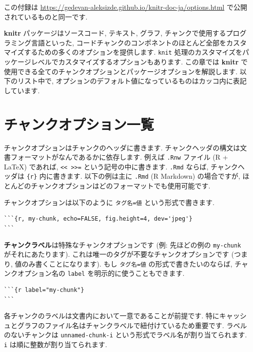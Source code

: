 \documentclass[
  11pt,
]{bxjsreport}
\makeatletter
\newenvironment{kframe}{%
\medskip{}
\setlength{\fboxsep}{.8em}
 \def\at@end@of@kframe{}%
 \ifinner\ifhmode%
  \def\at@end@of@kframe{\end{minipage}}%
  \begin{minipage}{\columnwidth}%
 \fi\fi%
 \def\FrameCommand##1{\hskip\@totalleftmargin \hskip-\fboxsep
 \colorbox{shadecolor}{##1}\hskip-\fboxsep
     \hskip-\linewidth \hskip-\@totalleftmargin \hskip\columnwidth}%
 \MakeFramed {\advance\hsize-\width
   \@totalleftmargin\z@ \linewidth\hsize
   \@setminipage}}%
 {\par\unskip\endMakeFramed%
 \at@end@of@kframe}
\newenvironment{rmdblock}[1]
  {
  \begin{itemize}
  \renewcommand{\labelitemi}{
    \raisebox{-.7\height}[0pt][0pt]{
      {\setkeys{Gin}{width=3em,keepaspectratio}\texttt{[image: \_latex/\_img/\#1]}}
    }
  }
  \setlength{\fboxsep}{1em}
  \begin{kframe}
  \item
  }
  {
  \end{kframe}
  \end{itemize}
  }
\newenvironment{rmdtip}
  {\begin{rmdblock}{tip}}
  {\end{rmdblock}}
\makeatother
\begin{document}
\begin{rmdtip}
この付録は \url{https://gedevan-aleksizde.github.io/knitr-doc-ja/options.html} で公開されているものと同一です. \end{rmdtip}

\textbf{knitr} パッケージはソースコード, テキスト, グラフ, チャンクで使用するプログラミング言語といった, コードチャンクのコンポネントのほとんど全部をカスタマイズするための多くのオプションを提供します. \texttt{knit} 処理のカスタマイズをパッケージレベルでカスタマイズするオプションもあります. この章では \textbf{knitr} で使用できる全てのチャンクオプションとパッケージオプションを解説します. 以下のリスト中で, オプションのデフォルト値になっているものはカッコ内に表記しています.

\hypertarget{chunk-options-full}{%
\section{チャンクオプション一覧}\label{chunk-options-full}}

チャンクオプションはチャンクのヘッダに書きます. チャンクヘッダの構文は文書フォーマットがなんであるかに依存します. 例えば \texttt{.Rnw} ファイル (R + LaTeX) であれば, \texttt{\textless{}\textless{}\ \textgreater{}\textgreater{}=} という記号の中に書きます. \texttt{.Rmd} ならば, チャンクヘッダは \texttt{\textasciigrave{}\textasciigrave{}\textasciigrave{}\{r\}} 内に書きます. 以下の例は主に \texttt{.Rmd} (R Markdown) の場合ですが, ほとんどのチャンクオプションはどのフォーマットでも使用可能です.

チャンクオプションは以下のように \texttt{タグ名=値} という形式で書きます.

\begin{verbatim}
```{r, my-chunk, echo=FALSE, fig.height=4, dev='jpeg'}
```
\end{verbatim}

\textbf{チャンクラベル}は特殊なチャンクオプションです (例: 先ほどの例の \texttt{my-chunk} がそれにあたります). これは唯一のタグが不要なチャンクオプションです (つまり, 値のみ書くことになります). もし \texttt{タグ名=値} の形式で書きたいのならば, チャンクオプション名の \texttt{label} を明示的に使うこともできます.

\begin{verbatim}
```{r label="my-chunk"}
```
\end{verbatim}

各チャンクのラベルは文書内において一意であることが前提です. 特にキャッシュとグラフのファイル名はチャンクラベルで紐付けているため重要です. ラベルのないチャンクは \texttt{unnamed-chunk-i} という形式でラベル名が割り当てられます. \texttt{i} は順に整数が割り当てられます.
\end{document}
